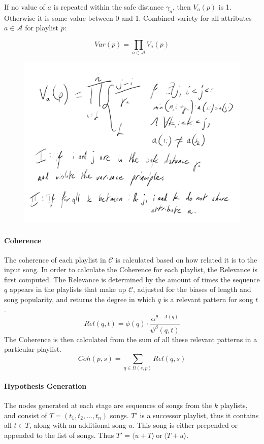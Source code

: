 \documentclass[a4paper, 12pt]{report}
\begin{document}
If no value of \(a\) is repeated within the safe distance \(\gamma_a\), then \(V_a(p)\) is 1. Otherwise it is some value between 0 and 1.
Combined variety for all attributes \(a \in \mathcal{A}\) for playlist \(p\):

\[Var(p) = \prod_{a\in\mathcal{A}} V_a(p)\]

\begin{figure}[H]
    \centering
    \includegraphics[width=\textwidth]{variance.png}
\end{figure}

\paragraph{Coherence}
The coherence of each playlist in \(\mathcal{C}\) is calculated based on how related it is to the input song. 
In order to calculate the Coherence for each playlist, the Relevance is first computed. 
The Relevance is determined by the amount of times the sequence \(q\) appears in the playlists that make up \(\mathcal{C}\), 
adjusted for the biases of length and song popularity, and returns the degree in which \(q\) is a relevant pattern for song \(t\).
\[Rel(q, t) = \phi(q) \cdot \frac{\alpha^{\theta-\Lambda(q)}}{\psi^\beta(q, t)} \]
The Coherence is then calculated from the sum of all these relevant patterns in a particular playlist.
\[Coh(p, s) = \sum_{q\in\Omega(s, p)} Rel(q, s) \]

\paragraph{Hypothesis Generation}
The nodes generated at each stage are sequences of songs from the \(k\) playlists, and consist of \(T = (t_1, t_2, ..., t_n)\) songs. 
\(T'\) is a successor playlist, thus it contains all \(t \in T\), along with an additional song \(u\). This song is either prepended or appended to the list 
of songs. Thus \(T' = \langle u + T \rangle\ \text{or}\ \langle T + u \rangle\).
\end{document}
